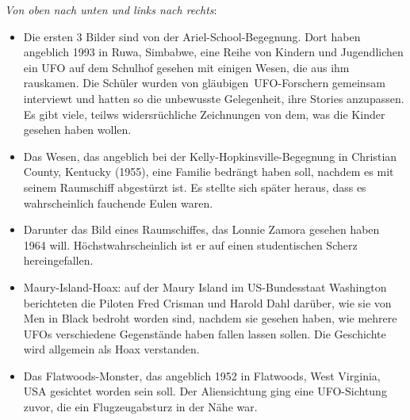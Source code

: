 \documentclass{scrartcl}
\begin{document}
\textit{Von oben nach unten und links nach rechts}:

\begin{itemize}
	\item Die ersten 3 Bilder sind von der Ariel-School-Begegnung. Dort haben angeblich 1993 in Ruwa, Simbabwe, eine Reihe von Kindern und Jugendlichen ein UFO auf dem Schulhof gesehen mit einigen Wesen, die aus ihm rauskamen.
		Die Schüler wurden von \frq gläubigen\flq\ UFO-Forschern gemeinsam interviewt und hatten so die unbewusste Gelegenheit, ihre Stories anzupassen. Es gibt viele, teilws widersrüchliche Zeichnungen von dem, was die Kinder gesehen haben wollen.

	\item Das Wesen, das angeblich bei der Kelly-Hopkinsville-Begegnung in Christian County, Kentucky (1955), eine Familie bedrängt haben soll, nachdem es mit seinem Raumschiff abgestürzt ist. Es stellte sich später heraus, dass es wahrscheinlich fauchende Eulen waren.
	\item Darunter das Bild eines Raumschiffes, das Lonnie Zamora gesehen haben 1964 will. Höchstwahrscheinlich ist er auf einen studentischen Scherz hereingefallen.
	\item Maury-Island-Hoax: auf der Maury Island im US-Bundesstaat Washington berichteten die Piloten Fred Crisman und Harold Dahl darüber, wie sie von Men in Black bedroht worden sind, nachdem sie gesehen haben, wie mehrere UFOs verschiedene Gegenstände haben fallen lassen sollen. Die Geschichte wird allgemein als Hoax verstanden.

	\item Das \frq Flatwoods-Monster\flq, das angeblich 1952 in Flatwoods, West Virginia, USA gesichtet worden sein soll. Der Aliensichtung ging eine UFO-Sichtung zuvor, die ein Flugzeugabsturz in der Nähe war.

\end{itemize}
\end{document}

